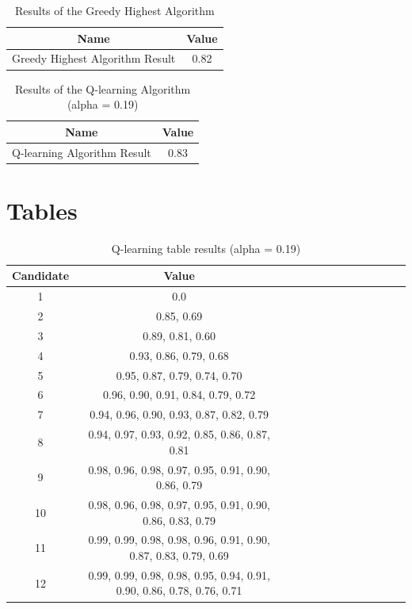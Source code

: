 \documentclass{article}
\begin{document}
\begin{appendices}
\begin{table}[ht]
    \centering
    \begin{tabular}{@{}cc@{}}
    \toprule
    \textbf{Name} & \textbf{Value} \\ \midrule
    Greedy Highest Algorithm Result & 0.82 \\ \bottomrule
    \end{tabular}
    \caption{Results of the Greedy Highest Algorithm}
    \label{tab:greedy-highest}
\end{table}

\begin{table}[ht]
    \centering
    \begin{tabular}{@{}cc@{}}
    \toprule
    \textbf{Name} & \textbf{Value} \\ \midrule
    Q-learning Algorithm Result & 0.83 \\ \bottomrule
    \end{tabular}
    \caption{Results of the Q-learning Algorithm (alpha = 0.19)}
    \label{tab:Q-learning}
\end{table}

\newpage
\section*{Tables}

\begin{table}[ht]
    \centering
    \caption{Q-learning table results (alpha = 0.19)}
    \label{tab:data-Q-learning-hiring}
    \begin{tabular}{|c|c|c|c|c|c|c|c|c|c|c|c|c|}
        \hline
        Candidate & Value \\
        \hline
	1 & 0.0 \\
        2 & 0.85, 0.69 \\
        3 & 0.89, 0.81, 0.60 \\
        4 & 0.93, 0.86, 0.79, 0.68 \\
        5 & 0.95, 0.87, 0.79, 0.74, 0.70 \\
        6 & 0.96, 0.90, 0.91, 0.84, 0.79, 0.72 \\
        7 & 0.94, 0.96, 0.90, 0.93, 0.87, 0.82, 0.79 \\
        8 & 0.94, 0.97, 0.93, 0.92, 0.85, 0.86, 0.87, 0.81 \\
        9 & 0.98, 0.96, 0.98, 0.97, 0.95, 0.91, 0.90, 0.86, 0.79 \\
        10 & 0.98, 0.96, 0.98, 0.97, 0.95, 0.91, 0.90, 0.86, 0.83, 0.79 \\
        11 & 0.99, 0.99, 0.98, 0.98, 0.96, 0.91, 0.90, 0.87, 0.83, 0.79, 0.69 \\
        12 & 0.99, 0.99, 0.98, 0.98, 0.95, 0.94, 0.91, 0.90, 0.86, 0.78, 0.76, 0.71 \\
        \hline
    \end{tabular}
\end{table}


\end{appendices}
\end{document}
